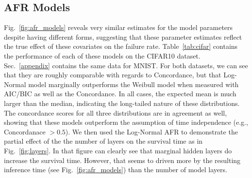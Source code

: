 \subsection{AFR Models}
Fig.~\ref{fig:afr_models} reveals very similar estimates for the model parameters despite having different forms, suggesting that these parameter estimates reflect the true effect of these covariates on the failure rate. Table~\ref{tab:cifar} contains the performance of each of these models on the CIFAR10 dataset.  Sec.~\ref{appendix} contains the same data for MNIST. For both datasets, we can see that they are roughly comparable with regards to Concordance, but that Log-Normal model marginally outperforms the Weibull model when measured with AIC/BIC as well as the Concordance. 
In all cases, the expected mean is much larger than the median, indicating the long-tailed nature of these distributions. 
The concordance scores for all three distributions are in agreement as well, showing that these models outperform the assumption of time independence (e.g., Concordanace $> 0.5$). 
We then used the Log-Normal AFR to demonstrate the partial effect of the the number of layers on the survival time as in Fig.~\ref{fig:layers}. In that figure can clearly see that marginal hidden layers do increase the survival time. However, that seems to driven more by the resulting inference time (see Fig.~\ref{fig:afr_models}) than the number of model layers.
